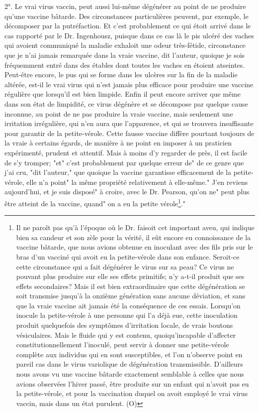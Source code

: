 2°. Le vrai virus vaccin, peut aussi lui-même dégénérer au point de ne produire qu'une vaccine bâtarde. Des circonstances particulières peuvent, par exemple, le décomposer par la putréfaction. Et c'est probablement ce qui étoit arrivé dans le cas rapporté par le Dr. Ingenhousz, puisque dans ce cas là le pis ulcéré des vaches qui avoient communiqué la maladie exhaloit une odeur très-fétide, circonstance que je n'ai jamais remarquée dans la vraie vaccine, dit l'auteur, quoique je sois fréquemment entré dans des étables dont toutes les vaches en étoient atseintes.
\setcounter{page}{271}
Peut-être encore, le pus qui se forme dans les ulcères sur la fin de la maladie altérée, est-il le vrai virus qui n'est jamais plus efficace pour produire une vaccine régulière que lorsqu'il est bien limpide. Enfin il peut encore arriver que même dans son état de limpidité, ce virus dégénère et se décompose par quelque cause inconnue, au point de ne pas produire la vraie vaccine, mais seulement une irritation irrégulière, qui n'en aura que l'apparence, et qui se trouvera insuffisante pour garantir de la petite-vérole. Cette fausse vaccine diffère pourtant toujours de la vraie à certains égards, de manière à ne point en imposer à un praticien expérimenté, prudent et attentif. Mais à moins d'y regarder de près, il est facile de s'y tromper; "et" c'est probablement par quelque erreur de" de ce genre que j'ai cru, "dit l'auteur," que quoique la vaccine garantisse efficacement de la petite-vérole, elle n'a point" la même propriété relativement à elle-même." J'en reviens aujourd'hui, et je suis disposé" à croire, avec le Dr. Pearson, qu'on ne" peut plus être atteint de la vaccine, quand" on a eu la petite vérole\footnote{Il ne paroît pas qu'à l'époque où le Dr. faisoit cet important aveu, qui indique bien sa candeur et son zèle pour la vérité, il eût encore eu connoissance de la vaccine bâtarde, que nous avions obtenue en inoculant avec des fils pris sur le bras d'un vacciné qui avoit eu la petite-vérole dans son enfance. Seroit-ce cette circonstance qui a fait dégénérer le virus sur sa peau? Ce virus ne pouvant plus produire sur elle ses effets primitifs; n'y a-t-il produit que ses effets secondaires? Mais il est bien extraordinaire que cette dégénération se soit transmise jusqu'à la onzième génération sans aucune déviation, et sans que la vraie vaccine ait jamais été la conséquence de ces essais. Lorsqu'on inocule la petite-vérole à une personne qui l'a déjà eue, cette inoculation produit quelquefois des symptômes d'irritation locale, de vrais boutons vésiculaires. Mais le fluide qui y est contenu, quoiqu'incapable d'affecter constitutionnellement l'inoculé, peut servir à donner une petite-vérole complète aux individus qui en sont susceptibles, et l'on n'observe point en pareil cas dans le virus variolique de dégénération transmissible. D'ailleurs nous avons vu une vaccine bâtarde exactement semblable à celles que nous avions observées l'hiver passé, être produite sur un enfant qui n'avoit pas eu la petite-vérole, et pour la vaccination duquel on avoit employé le vrai virus vaccin, mais dans un état purulent. (O)}."

